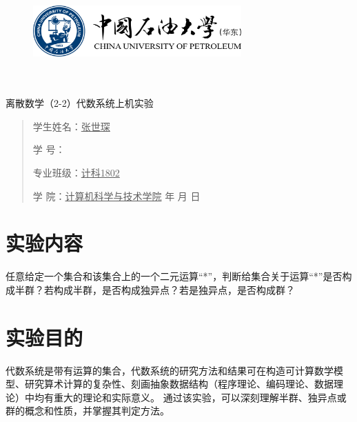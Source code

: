\documentclass{article}
\renewcommand{\today}{\number\year 年 \number\month 月 \number\day 日}
\begin{document}
\begin{figure}
    \centering
    \includegraphics[width=8cm]{upc.png}

    \label{figupc}
\end{figure}

	\begin{center}
		\quad \\
		\quad \\
		\heiti \fontsize{45}{17} \quad \quad \quad 
		\vskip 1.5cm
		\heiti {} 离散数学（2-2）代数系统上机实验
	\end{center}
	\vskip 3.0cm
		
	\begin{quotation}
		\doublespacing
		
        \par\setlength\parindent{7em}
		\quad 

		学生姓名：\underline{\qquad  张世琛 \qquad \qquad}

		学\hspace{0.61cm} 号：\underline{\qquad}
		
		专业班级：\underline{\qquad 计科1802 \qquad  }
		
        学\hspace{0.61cm} 院：\underline{计算机科学与技术学院}
		\vskip 5cm
		\centering
		\today
    \end{quotation}
\thispagestyle{empty}
\newpage
\setcounter{page}{1}
\section{实验内容}
任意给定一个集合和该集合上的一个二元运算“*”，判断给集合关于运算“*”是否构成半群？若构成半群，是否构成独异点？若是独异点，是否构成群？
\section{实验目的}
代数系统是带有运算的集合，代数系统的研究方法和结果可在构造可计算数学模型、研究算术计算的复杂性、刻画抽象数据结构（程序理论、编码理论、数据理论）中均有重大的理论和实际意义。
通过该实验，可以深刻理解半群、独异点或群的概念和性质，并掌握其判定方法。
\end{document}
